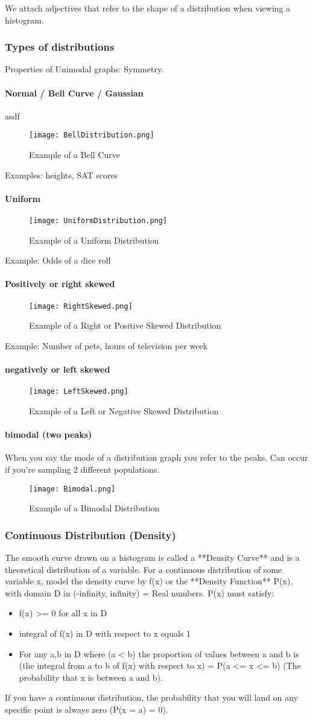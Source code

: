 \documentclass{article}
\newcommand{\p}[1]{\paragraph{#1}} %
\begin{document}
	We attach adjectives that refer to the shape of a distribution when viewing a histogram.
	
		\subsubsection{Types of distributions}
		
			Properties of Unimodal graphs: Symmetry.

			\p{Normal / Bell Curve / Gaussian} asdf
			\begin{figure}[!htb]
				\centering
				\texttt{[image: BellDistribution.png]}
				\caption{Example of a Bell Curve}
			\end{figure} 
			Examples: heights, SAT scores
			\p{Uniform}
			\begin{figure}[!htb]
				\centering
				\texttt{[image: UniformDistribution.png]}
				\caption{Example of a Uniform Distribution}
			\end{figure} 
			Example: Odds of a dice roll
			\p{Positively or right skewed}
			\begin{figure}[!htb]
				\centering
				\texttt{[image: RightSkewed.png]}
				\caption{Example of a Right or Positive Skewed Distribution}
			\end{figure}
			Example: Number of pets, hours of television per week
			\p{negatively or left skewed}
			\begin{figure}[!htb]
				\centering
				\texttt{[image: LeftSkewed.png]}
				\caption{Example of a Left or Negative Skewed Distribution}
			\end{figure}
			\p{bimodal (two peaks)}
			When you say the mode of a distribution graph you refer to the peaks.
			Can occur if you're sampling 2 different populations.
			\begin{figure}[!htb]
				\centering
				\texttt{[image: Bimodal.png]}
				\caption{Example of a Bimodal Distribution}
			\end{figure}
		
		\subsubsection{Continuous Distribution (Density)}
		The smooth curve drawn on a histogram is called a **Density Curve** and is a theoretical
		distribution of a variable. For a continuous distribution of some variable x, model the
		density curve by f(x) or the **Density Function** P(x). with domain D in (-infinity, infinity) = Real numbers.
		P(x) must satisfy:
		\begin{itemize}
			\item{f(x) >= 0 for all x in D}
			\item{integral of f(x) in D with respect to x equals 1}
			\item{For any a,b in D where (a < b) the proportion of values between a and b is (the integral from a to b of f(x) with respect to x) = P(a <= x <= b) (The probability that x is between a and b).}
		\end{itemize}
		If you have a continuous distribution, the probability that you will land on any specific point is always zero (P(x = a) = 0).
		
\end{document}

